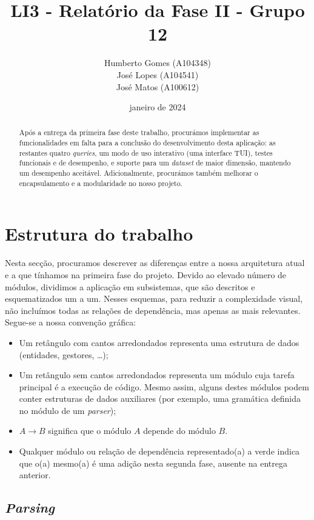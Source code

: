 \documentclass[12pt, a4paper]{article}
\title{\textbf{LI3 - Relatório da Fase II - Grupo 12}}
\author{
    Humberto Gomes (A104348) \\
    José Lopes     (A104541) \\
    José Matos     (A100612) \\
}
\date{janeiro de 2024}
\begin{document}
\maketitle
\onehalfspacing
\setlength{\parskip}{\baselineskip}
\setlength{\parindent}{0pt}

\begin{abstract}
    Após a entrega da primeira fase deste trabalho, procurámos implementar as funcionalidades em
    falta para a conclusão do desenvolvimento desta aplicação: as restantes quatro \emph{queries},
    um modo de uso interativo (uma interface TUI), testes funcionais e de desempenho, e suporte
    para um \emph{dataset} de maior dimensão, mantendo um desempenho aceitável. Adicionalmente,
    procurámos também melhorar o encapsulamento e a modularidade no nosso projeto.
\end{abstract}

\section{Estrutura do trabalho}

Nesta secção, procuramos descrever as diferenças entre a nossa arquitetura atual e a que tínhamos
na primeira fase do projeto. Devido ao elevado número de módulos, dividimos a aplicação em
subsistemas, que são descritos e esquematizados um a um. Nesses esquemas, para reduzir a
complexidade visual, não incluímos todas as relações de dependência, mas apenas as mais relevantes.
Segue-se a nossa convenção gráfica:

\begin{itemize}
    \item Um retângulo com cantos arredondados representa uma estrutura de dados (entidades,
          gestores, \ldots);
    \item Um retângulo sem cantos arredondados representa um módulo cuja tarefa principal é a
          execução de código. Mesmo assim, alguns destes módulos podem conter estruturas de dados
          auxiliares (por exemplo, uma gramática definida no módulo de um \emph{parser});
    \item $A \rightarrow B$ significa que o módulo $A$ depende do módulo $B$.
    \item Qualquer módulo ou relação de dependência representado(a) a {\color{ForestGreen}verde}
          indica que o(a) mesmo(a) é uma adição nesta segunda fase, ausente na entrega anterior.
\end{itemize}

\subsection{\emph{Parsing}}
\label{sec:parsing}
\end{document}
